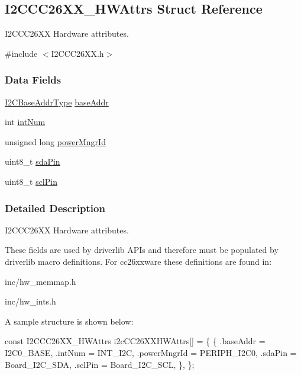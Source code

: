 \subsection{I2\+C\+C\+C26\+X\+X\+\_\+\+H\+W\+Attrs Struct Reference}
\label{struct_i2_c_c_c26_x_x___h_w_attrs}


I2\+C\+C\+C26\+X\+X Hardware attributes.  




{\ttfamily \#include $<$I2\+C\+C\+C26\+X\+X.\+h$>$}

\subsubsection*{Data Fields}
\begin{DoxyCompactItemize}
\item 
\hyperlink{_i2_c_c_c26_x_x_8h_a6e087d828c4463de0061d8205b2245d8}{I2\+C\+Base\+Addr\+Type} \hyperlink{struct_i2_c_c_c26_x_x___h_w_attrs_a45cbf1a9044afdd06f0aa82319c977ef}{base\+Addr}
\item 
int \hyperlink{struct_i2_c_c_c26_x_x___h_w_attrs_a429ce62b1e66221f0b702729cd1ac20e}{int\+Num}
\item 
unsigned long \hyperlink{struct_i2_c_c_c26_x_x___h_w_attrs_aac2a311e3ef7b95a85b648026ac60780}{power\+Mngr\+Id}
\item 
uint8\+\_\+t \hyperlink{struct_i2_c_c_c26_x_x___h_w_attrs_a011bf667fa99fa23a5609d74cb729cb7}{sda\+Pin}
\item 
uint8\+\_\+t \hyperlink{struct_i2_c_c_c26_x_x___h_w_attrs_a05531669bc614278c181e2720499f1b6}{scl\+Pin}
\end{DoxyCompactItemize}


\subsubsection{Detailed Description}
I2\+C\+C\+C26\+X\+X Hardware attributes. 

These fields are used by driverlib A\+P\+Is and therefore must be populated by driverlib macro definitions. For cc26xxware these definitions are found in\+:
\begin{DoxyItemize}
\item inc/hw\+\_\+memmap.\+h
\item inc/hw\+\_\+ints.\+h
\end{DoxyItemize}

A sample structure is shown below\+: 
\begin{DoxyCode}
\textcolor{keyword}{const} I2CCC26XX_HWAttrs i2cCC26XXHWAttrs[] = \{
    \{
       .baseAddr = I2C0\_BASE,
       .intNum = INT\_I2C,
       .powerMngrId = PERIPH\_I2C0,
       .sdaPin = Board\_I2C\_SDA,
       .sclPin = Board\_I2C\_SCL,
    \},
\};
\end{DoxyCode}
 

